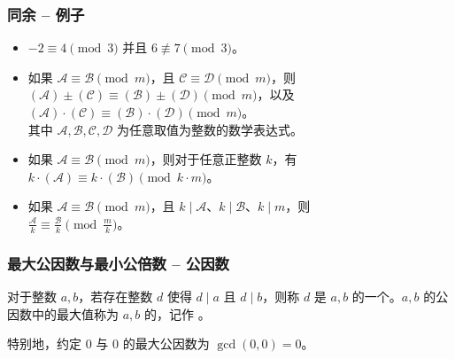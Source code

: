 \documentclass{../pkslide}
\newcommand{\nequiv}{\not\equiv} %
\begin{document}
\begin{frame}
  \frametitle{同余 -- 例子}
  
  \begin{examples}[同余]
    \begin{itemize}
      \item<2-> $-2 \equiv 4 \pmod{3}$ 并且 $6 \nequiv 7 \pmod{3}$。
      \item<3-> 如果 $\mathcal{A} \equiv \mathcal{B} \pmod{m}$，且 $\mathcal{C} \equiv \mathcal{D} \pmod{m}$，则\\
        \-\hspace{2em} $(\mathcal{A}) \pm (\mathcal{C}) \equiv (\mathcal{B}) \pm (\mathcal{D}) \pmod{m}$，以及\\
        \-\hspace{2em} $(\mathcal{A}) \cdot (\mathcal{C}) \equiv (\mathcal{B}) \cdot (\mathcal{D}) \pmod{m}$。\\
        其中 $\mathcal{A}, \mathcal{B}, \mathcal{C}, \mathcal{D}$ 为任意取值为整数的数学表达式。
      \item<4-> 如果 $\mathcal{A} \equiv \mathcal{B} \pmod{m}$，则对于任意正整数 $k$，有\\
        \-\hspace{2em} $k \cdot (\mathcal{A}) \equiv k \cdot (\mathcal{B}) \pmod{k \cdot m}$。
      \item<5-> 如果 $\mathcal{A} \equiv \mathcal{B} \pmod{m}$，且 $k \mid \mathcal{A}$、$k \mid \mathcal{B}$、$k \mid m$，则\\
        \-\hspace{2em} $\frac{\mathcal{A}}{k} \equiv \frac{\mathcal{B}}{k} \pmod{\frac{m}{k}}$。
    \end{itemize}
  \end{examples}
\end{frame}

\begin{frame}
  \frametitle{最大公因数与最小公倍数 -- 公因数}
  
  \begin{definition}[公因数与最大公因数]
    对于整数 $a, b$，若存在整数 $d$ 使得 $d \mid a$ 且 $d \mid b$，则称 $d$ 是 $a, b$ 的一个。$a, b$ 的公因数中的最大值称为 $a, b$ 的，记作 。
    
    特别地，约定 $0$ 与 $0$ 的最大公因数为 $\gcd(0, 0) = 0$。
    
  \end{definition}
\end{frame}
\end{document}
